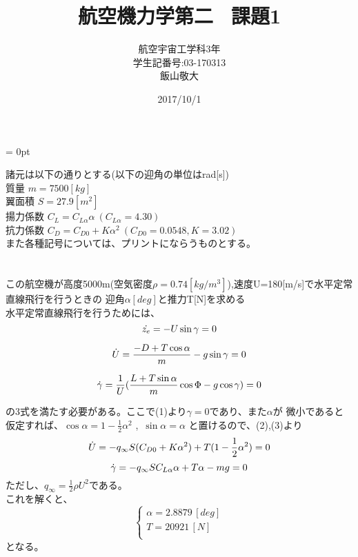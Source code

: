 \documentclass[15pt,uplatex,dvipdfmx]{jsarticle}
\title{航空機力学第二 \, 課題1}
\author{航空宇宙工学科3年 \\ 学生記番号:03-170313 \\ 飯山敬大}
\date{2017/10/1}
\begin{document}
\parindent = 0pt

\maketitle

諸元は以下の通りとする(以下の迎角の単位はrad[s]) \\
質量 $m=7500[kg]$ \\
翼面積 $S=27.9[m^2]$ \\
揚力係数 $C_L = C_{L\alpha}\alpha \ (C_{L\alpha} =4.30)$ \\
抗力係数 $C_D = C_{D0} + K{\alpha}^2 \ (C_{D0} = 0.0548 , K = 3.02)$ \\
また各種記号については、プリントにならうものとする。

\section{}
この航空機が高度5000m(空気密度$\rho=0.74[kg/m^3]$),速度U=180[m/s]で水平定常直線飛行を行うときの
迎角$\alpha[deg]$と推力T[N]を求める \\
水平定常直線飛行を行うためには、\\
\begin{equation}
    \dot{z_e} = -U \sin{\gamma} =0 \\
\end{equation}

\begin{equation}
    \dot{U} = \frac{-D + T\cos{\alpha}}{m} - g\sin{\gamma} =0 \\
\end{equation}

\begin{equation}
    \dot{\gamma} = \frac{1}{U}(\frac{L+T\sin{\alpha}}{m}\cos{\Phi}-g\cos{\gamma}) = 0 \\
\end{equation}

の3式を満たす必要がある。ここで(1)より$\gamma = 0$であり、また$\alpha$が
微小であると仮定すれば、$\cos{\alpha} = 1 - \frac{1}{2} {\alpha}^2$ ,\, $\sin{\alpha} = \alpha$
と置けるので、(2),(3)より
\begin{equation}
   \dot{U} = - q_{\infty}S(C_{D0} + K{\alpha}^2) + T(1 - \frac{1}{2} \alpha^2) = 0 \\
\end{equation}
\begin{equation}
  \dot{\gamma} = - q_{\infty}S C_{L\alpha} \alpha + T\alpha - mg = 0\\
\end{equation}
ただし、$ q_{\infty}= \frac{1}{2}\rho U^2 $である。 \\
これを解くと、\\
\begin{equation}
  \begin{cases}
    \alpha = 2.8879 \, [deg] \\
    T = 20921 \, [N] \\
  \end{cases}
\end{equation}
となる。
\end{document}
